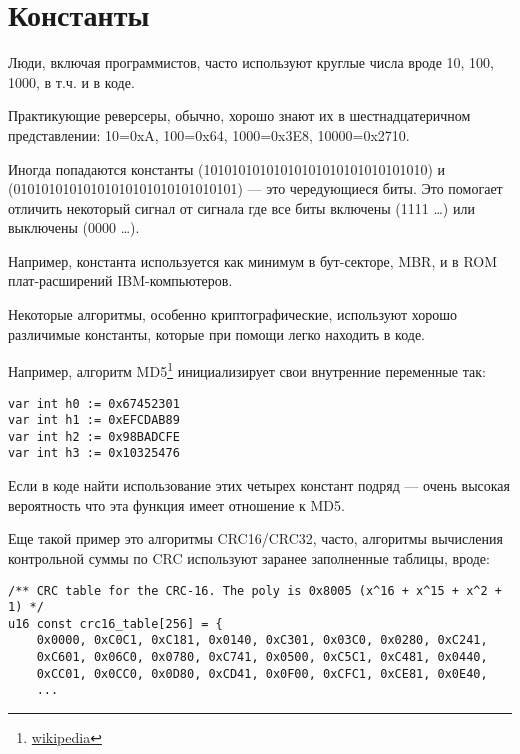 \chapter{Константы}

Люди, включая программистов, часто используют круглые числа вроде 10, 100, 1000, в т.ч. и в коде.

Практикующие реверсеры, обычно, хорошо знают их в шестнадцатеричном представлении:
10=0xA, 100=0x64, 1000=0x3E8, 10000=0x2710.

Иногда попадаются константы  (10101010101010101010101010101010) и \\
 (01010101010101010101010101010101) --- это чередующиеся биты.
Это помогает отличить некоторый сигнал от сигнала где все биты включены (1111 \dots) или выключены (0000 \dots).

Например, константа  используется как минимум в бут-секторе, \ac{MBR}, 
и в \ac{ROM} плат-расширений IBM-компьютеров.

Некоторые алгоритмы, особенно криптографические, используют хорошо различимые константы, 
которые при помощи \IDA легко находить в коде.

\newcommand{\URLMD}{http://go.yurichev.com/17110}

Например, алгоритм MD5\footnote{\href{\URLMD}{wikipedia}} инициализирует свои внутренние переменные так:

\begin{verbatim}
var int h0 := 0x67452301
var int h1 := 0xEFCDAB89
var int h2 := 0x98BADCFE
var int h3 := 0x10325476
\end{verbatim}

Если в коде найти использование этих четырех констант подряд --- очень высокая вероятность что эта функция имеет отношение к MD5.

\par
Еще такой пример это алгоритмы CRC16/CRC32, часто, алгоритмы вычисления контрольной суммы по CRC 
используют заранее заполненные таблицы, вроде:

\begin{lstlisting}[caption=linux/lib/crc16.c]
/** CRC table for the CRC-16. The poly is 0x8005 (x^16 + x^15 + x^2 + 1) */
u16 const crc16_table[256] = {
	0x0000, 0xC0C1, 0xC181, 0x0140, 0xC301, 0x03C0, 0x0280, 0xC241,
	0xC601, 0x06C0, 0x0780, 0xC741, 0x0500, 0xC5C1, 0xC481, 0x0440,
	0xCC01, 0x0CC0, 0x0D80, 0xCD41, 0x0F00, 0xCFC1, 0xCE81, 0x0E40,
	...
\end{lstlisting}

